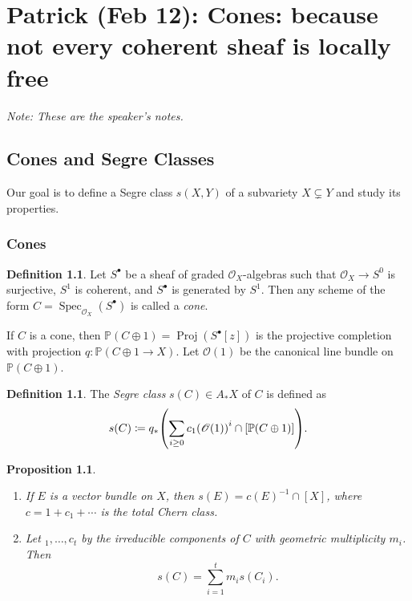 \documentclass[leqno, openany]{memoir}
\newtheorem{prop}[thm]{Proposition}
\theoremstyle{definition}
\newtheorem{defn}[thm]{Definition}
\theoremstyle{remark}
\theoremstyle{plain}
\theoremstyle{definition}
\theoremstyle{remark}
\renewcommand{\P}{\mathbb{P}}
\newcommand{\msc}[1]{\mathscr{#1}}
\DeclareMathOperator{\Spec}{Spec}
\DeclareMathOperator{\Proj}{Proj}
\begin{document}
\chapter{Patrick (Feb 12): Cones: because not every coherent sheaf is locally free}%
\label{cha:patrick_feb_12_}

\textit{Note: These are the speaker's notes.} 

\section{Cones and Segre Classes}%
\label{sec:cones_and_segre_classes}

Our goal is to define a Segre class $s(X,Y)$ of a subvariety $X \subsetneq Y$ and study its properties.

\subsection{Cones}%
\label{sub:cones}

\begin{defn}
    Let $S^{\bullet}$ be a sheaf of graded $\msc{O}_X$-algebras such that $\msc{O}_X \to S^0$ is surjective, $S^1$ is coherent, and $S^{\bullet}$ is generated by $S^1$. Then any scheme of the form $C = \Spec_{\msc{O}_X}(S^{\bullet})$ is called a \textit{cone}. 
\end{defn}

If $C$ is a cone, then $\P(C \oplus 1) = \Proj (S^{\bullet}[z])$ is the projective completion with projection $q \colon \P(C \oplus 1 \to X)$. Let $\msc{O}(1)$ be the canonical line bundle on $\P(C \oplus 1)$.

\begin{defn}
    The \textit{Segre class} $s(C) \in A_* X$ of $C$ is defined as
    \[ s(C) \coloneqq q_* \qty( \sum_{i \geq 0} {c_1(\msc{O}(1))}^i \cap [\P(C \oplus 1)] ). \]
\end{defn}

\begin{prop}\leavevmode
    \begin{enumerate}
        \item If $E$ is a vector bundle on $X$, then $s(E) = {c(E)}^{-1} \cap [X]$, where $c = 1 + c_1 + \cdots$ is the total Chern class.
        \item Let $_1, \ldots, c_t$ by the irreducible components of $C$ with geometric multiplicity $m_i$. Then
            \[ s(C) = \sum_{i = 1}^t m_i s(C_i). \]
    \end{enumerate}
\end{prop}
\end{document}
